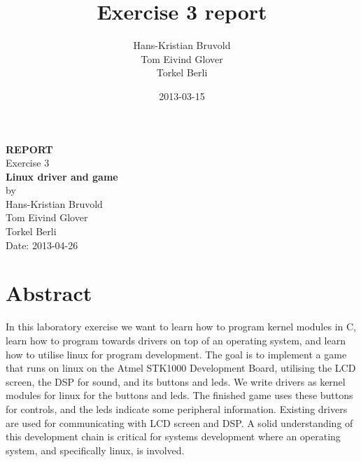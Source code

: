 \documentclass[12pt,a4paper,final]{report}
\author{Hans-Kristian Bruvold\\Tom Eivind Glover\\Torkel Berli}
\title{Exercise 3 report}
\date{2013-03-15}
\numberwithin{equation}{section}
\numberwithin{table}{section}
\numberwithin{figure}{section}
\begin{document}
\begin{titlepage} %

\pagestyle{fancy}
\rhead{}
\cfoot{}
\begin{center}

\bigskip
\textbf{\LARGE REPORT}\\
\vspace{1.5cm}
\textnormal{\LARGE Exercise 3}\\
\vspace{1cm}
\textbf{\LARGE Linux driver and game}\\

\vspace{3cm}
by
\\
\vspace{0.5cm}
Hans-Kristian Bruvold\\
Tom Eivind Glover\\
Torkel Berli\\


\vspace{9cm}
Date: 2013-04-26

\end{center}

\end{titlepage} %

\pagestyle{fancy}
\chead{}
\lhead{}


\section*{Abstract}
\label{sec:abstract} %

In this laboratory exercise we want to learn how to program kernel modules in C, learn how to program towards drivers on top of an operating system, and learn how to utilise linux for program development. The goal is to implement a game that runs on linux on the Atmel STK1000 Development Board, utilising the LCD screen, the DSP for sound, and its buttons and leds. We write drivers as kernel modules for linux for the buttons and leds. The finished game uses these buttons for controls, and the leds indicate some peripheral information. Existing drivers are used for communicating with LCD screen and DSP. A solid understanding of this development chain is critical for systems development where an operating system, and specifically linux, is involved.

\newpage
\end{document}
